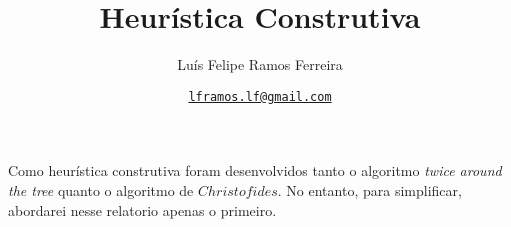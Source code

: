 \documentclass{article}
\title{Heurística Construtiva}
\author{Luís Felipe Ramos Ferreira}
\date{\href{mailto:lframos.lf@gmail.com}{\texttt{lframos.lf@gmail.com}}
}
\begin{document}
\maketitle

Como heurística construtiva foram desenvolvidos tanto o algoritmo \textit{twice around the tree} quanto o algoritmo de \(Christofides\).
No entanto, para simplificar, abordarei nesse relatorio apenas o primeiro.
\end{document}
